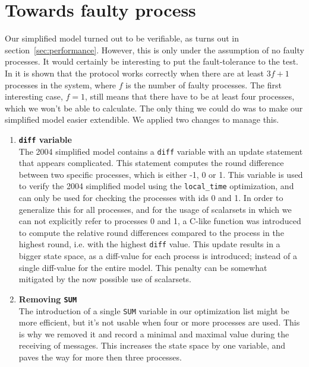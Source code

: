 \documentclass[a4paper,10pt]{article}
\newcommand{\oldsimple}{2004 simplified model\xspace}
\newcommand{\newsimple}{our simplified model\xspace}
\newcommand{\Newsimple}{Our simplified model\xspace}
\begin{document}

\section{Towards faulty process\label{sec:faulty}}

\Newsimple turned out to be verifiable, as turns out in section~\ref{sec:performance}. However, this is only under the assumption of no faulty processes. It would certainly be interesting to put the fault-tolerance to the test. In \cite{Welch1984Anew} it is shown that the protocol works correctly when there are at least \(3f+1\) processes in the system, where \(f\) is the number of faulty processes. The first interesting case, \(f=1\), still means that there have to be at least four processes, which we won't be able to calculate. The only thing we could do was to make \newsimple easier extendible. We applied two changes to manage this.


\begin{enumerate}
\item \textbf{\texttt{diff} variable} \\
	The \oldsimple contains a \texttt{diff} variable with an update statement that appears complicated. This statement computes the round difference between two specific processes, which is either -1, 0 or 1. This variable is used to verify the \oldsimple using the \texttt{local\_time} optimization, and can only be used for checking the processes with ids 0 and 1. In order to generalize this for all processes, and for the usage of scalarsets in which we can not explicitly refer to processes 0 and 1, a C-like function was introduced to compute the relative round differences compared to the process in the highest round, i.e. with the highest \texttt{diff} value. This update results in a bigger state space, as a diff-value for each process is introduced; instead of a single diff-value for the entire model. This penalty can be somewhat mitigated by the now possible use of scalarsets.

\item \textbf{Removing \texttt{SUM}} \\
	The introduction of a single \texttt{SUM} variable in our optimization list might be more efficient, but it's not usable when four or more processes are used. This is why we removed it and record a minimal and maximal value during the receiving of messages. This increases the state space by one variable, and paves the way for more then three processes.
\end{enumerate}
\end{document}
